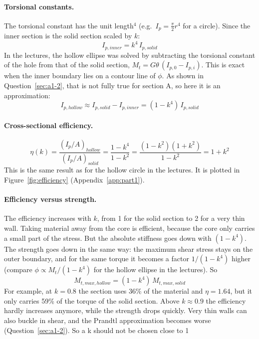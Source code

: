 \paragraph{Torsional constants.}
The torsional constant has the unit length$^4$ (e.g.\ $I_p = \frac{\pi}{2}r^4$ for a circle). Since the inner section is the solid section scaled by $k$:
\begin{equation}
    I_{p,inner} = k^4\,I_{p,solid}
\end{equation}
In the lectures, the hollow ellipse was solved by subtracting the torsional constant of the hole from that of the solid section, $M_t = G\theta\,(I_{p,0} - I_{p,i})$. This is exact when the inner boundary lies on a contour line of $\phi$. As shown in Question~\ref{sec:a1-2}, that is not fully true for section A, so here it is an approximation:
\begin{equation}
    I_{p,hollow} \approx I_{p,solid} - I_{p,inner} = (1-k^4)\,I_{p,solid}
\end{equation}

\paragraph{Cross-sectional efficiency.}
\begin{equation}
    \eta(k) = \frac{(I_p/A)_{hollow}}{(I_p/A)_{solid}}
    = \frac{1-k^4}{1-k^2}
    = \frac{(1-k^2)(1+k^2)}{1-k^2}
    = 1+k^2
\end{equation}
This is the same result as for the hollow circle in the lectures. It is plotted in Figure~\ref{fig:efficiency} (Appendix~\ref{app:part1}).

\paragraph{Efficiency versus strength.}
The efficiency increases with $k$, from 1 for the solid section to 2 for a very thin wall. Taking material away from the core is efficient, because the core only carries a small part of the stress. But the absolute stiffness goes down with $(1-k^4)$. The strength goes down in the same way: the maximum shear stress stays on the outer boundary, and for the same torque it becomes a factor $1/(1-k^4)$ higher (compare $\phi \propto M_t/(1-k^4)$ for the hollow ellipse in the lectures). So
\begin{equation}
    M_{t,max,hollow} = (1-k^4)\,M_{t,max,solid}
\end{equation}
For example, at $k=0.8$ the section uses 36\% of the material and $\eta=1.64$, but it only carries 59\% of the torque of the solid section. Above $k\approx0.9$ the efficiency hardly increases anymore, while the strength drops quickly. Very thin walls can also buckle in shear, and the Prandtl approximation becomes worse (Question~\ref{sec:a1-2}). So a k should not be chosen close to 1

